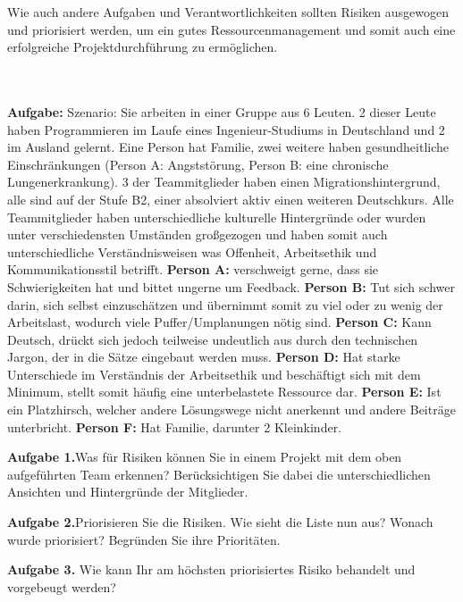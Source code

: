 \documentclass[a4paper]{article}
\begin{document}
Wie auch andere Aufgaben und Verantwortlichkeiten sollten Risiken ausgewogen und priorisiert werden, um ein gutes Ressourcenmanagement und somit auch eine erfolgreiche Projektdurchführung zu ermöglichen.\\\\\\
\newpage
\begin{flushleft}
\textbf{Aufgabe:}\newline \newline
Szenario: Sie arbeiten in einer Gruppe aus 6 Leuten. 2 dieser Leute haben Programmieren im Laufe eines Ingenieur-Studiums in Deutschland und 2 im Ausland gelernt. Eine Person hat Familie, zwei weitere haben gesundheitliche Einschränkungen (Person A: Angststörung, Person B: eine chronische Lungenerkrankung). 3 der Teammitglieder haben einen Migrationshintergrund, alle sind auf der Stufe B2, einer absolviert aktiv einen weiteren Deutschkurs. Alle Teammitglieder haben unterschiedliche kulturelle Hintergründe oder wurden unter verschiedensten Umständen großgezogen und haben somit auch unterschiedliche Verständnisweisen was Offenheit, Arbeitsethik und Kommunikationsstil betrifft. \newline \newline \textbf{Person A:} verschweigt gerne, dass sie Schwierigkeiten hat und bittet ungerne um Feedback. \newline \textbf{Person B:} Tut sich schwer darin, sich selbst einzuschätzen und übernimmt somit zu viel oder zu wenig der Arbeitslast, wodurch viele Puffer/Umplanungen nötig sind. \newline \textbf{Person C:} Kann Deutsch, drückt sich jedoch teilweise undeutlich aus durch den technischen Jargon, der in die Sätze eingebaut werden muss. \newline \textbf{Person D:} Hat starke Unterschiede im Verständnis der Arbeitsethik und beschäftigt sich mit dem Minimum, stellt somit häufig eine unterbelastete Ressource dar. \newline \textbf{Person E:} Ist ein Platzhirsch, welcher andere Lösungswege nicht anerkennt und andere Beiträge unterbricht. \newline \textbf{Person F:} Hat Familie, darunter 2 Kleinkinder.\newline \newline


\textbf{Aufgabe 1.}\newline Was für Risiken können Sie in einem Projekt mit dem oben aufgeführten Team erkennen? Berücksichtigen Sie dabei die unterschiedlichen Ansichten und Hintergründe der Mitglieder.\newline

\textbf{Aufgabe 2.}\newline Priorisieren Sie die Risiken. Wie sieht die Liste nun aus? Wonach wurde priorisiert? Begründen Sie ihre Prioritäten.\newline

\textbf{Aufgabe 3.} Wie kann Ihr am höchsten priorisiertes Risiko behandelt und vorgebeugt werden?
\end{flushleft}

% 
% 
\end{document}
